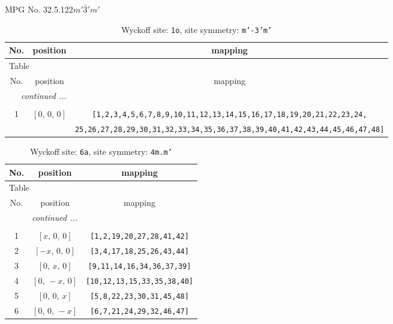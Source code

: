 \documentclass[fleqn,8pt]{jsarticle}
\begin{document}
\setcounter{MaxMatrixCols}{32}

\renewcommand{\tablename}{Table~}
\renewcommand{\figurename}{Figure~}
\begin{center}
\LARGE
MPG No. 32.5.122\quad$m'\bar{3}'m'$
\end{center}
\renewcommand{\arraystretch}{1.2}
\begin{longtable}{ccc}
\caption{Wyckoff site: {\tt 1o}, site symmetry: {\tt m'-3'm'}}
 \\
 \hline \hline
No. & position & mapping \\ \hline \endfirsthead

\multicolumn{2}{l}{\tablename\ \thetable{}} \\
 \hline \hline
No. & position & mapping \\ \hline \endhead

 \hline \hline
\multicolumn{2}{r}{\footnotesize\it continued ...} \\ \endfoot

 \hline \hline
\multicolumn{2}{r}{} \\ \endlastfoot

1 & $\left[ 0,\, 0,\, 0 \right]$ & {\tt [1,2,3,4,5,6,7,8,9,10,11,12,13,14,15,16,17,18,19,20,21,22,23,24,} \\ \hline
 &  & {\tt 25,26,27,28,29,30,31,32,33,34,35,36,37,38,39,40,41,42,43,44,45,46,47,48]} \\
\end{longtable}
\renewcommand{\arraystretch}{1.2}
\begin{longtable}{ccc}
\caption{Wyckoff site: {\tt 6a}, site symmetry: {\tt 4m.m'}}
 \\
 \hline \hline
No. & position & mapping \\ \hline \endfirsthead

\multicolumn{2}{l}{\tablename\ \thetable{}} \\
 \hline \hline
No. & position & mapping \\ \hline \endhead

 \hline \hline
\multicolumn{2}{r}{\footnotesize\it continued ...} \\ \endfoot

 \hline \hline
\multicolumn{2}{r}{} \\ \endlastfoot

1 & $\left[ x,\, 0,\, 0 \right]$ & {\tt [1,2,19,20,27,28,41,42]} \\ \hline
2 & $\left[ - x,\, 0,\, 0 \right]$ & {\tt [3,4,17,18,25,26,43,44]} \\ \hline
3 & $\left[ 0,\, x,\, 0 \right]$ & {\tt [9,11,14,16,34,36,37,39]} \\ \hline
4 & $\left[ 0,\, - x,\, 0 \right]$ & {\tt [10,12,13,15,33,35,38,40]} \\ \hline
5 & $\left[ 0,\, 0,\, x \right]$ & {\tt [5,8,22,23,30,31,45,48]} \\ \hline
6 & $\left[ 0,\, 0,\, - x \right]$ & {\tt [6,7,21,24,29,32,46,47]} \\
\end{longtable}
\end{document}
